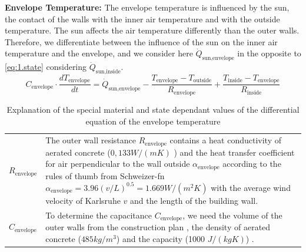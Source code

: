     \textbf{Envelope Temperature:}\newline
    The envelope temperature is influenced by the sun, the contact of the walls with the inner air temperature and with the outside temperature. The sun affects the air temperature differently than the outer walls. Therefore, we differentiate between the influence of the sun on the inner air temperature and the envelope, and we consider here $\dot{Q}_\text{sun,envelope}$ in the opposite to \autoref{eq:1.state} considering $\dot{Q}_\text{sun,inside}$.
    \begin{equation}
    \label{eq:diffEnvelope}
        C_\text{envelope}\cdot \frac{d T_\text{envelope}}{d t} = \dot{Q}_\text{sun,envelope} - \frac{T_\text{envelope}-T_\text{outside}}{R_\text{envelope}} + \frac{T_\text{inside}-T_\text{envelope}}{R_\text{inside}}
    \end{equation}
    \begin{table}[H]
        \centering
        \begin{tabular}{l p{13cm}}
        $R_\text{envelope}$ & The outer wall resistance $R_\text{envelope}$ contains a heat conductivity of aerated concrete ($0,133 W/(m K)$ \cite{GhaziWakili.2015}) and the heat transfer coefficient for air perpendicular to the wall outside $\alpha_\text{envelope}$ according to the rules of thumb from Schweizer-fn $\alpha_\text{envelope} = 3.96 (v / L)^{0.5} = 1.669 W/(m^2 K)$ \cite{Schweizer-fnalpha} with the average wind velocity of Karlsruhe $v$ \cite{AbteilungKlimaundUmweltberatung.2004} and the length of the building wall.\\
        $C_\text{envelope}$ & To determine the capacitance $C_\text{envelope}$, we need the volume of the outer walls from the construction plan \cite{Bauplan}, the density of aerated concrete ($485 kg/m^3$) and the capacity (1000 $J/(kg K)$) \cite{GhaziWakili.2015}.
        \end{tabular}
        \caption{Explanation of the special material and state dependant values of the differential equation of the envelope temperature}
        \label{tab:valuesOfEnvelopeTemperature}
    \end{table}
   
